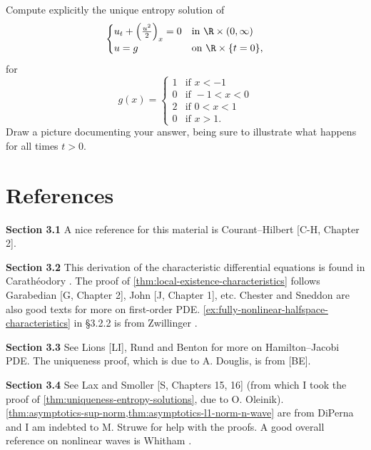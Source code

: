 \begin{exercise}
Compute explicitly the unique entropy solution of
$$
\begin{cases}
u_t + \left(\frac{u^2}{2}\right)_x = 0 & \text{in } \R \times (0, \infty) \\
u = g & \text{on } \R \times \{t = 0\},
\end{cases}
$$
for
$$g(x) = \begin{cases} 1 & \text{if } x < -1 \\ 0 & \text{if } -1 < x < 0 \\ 2 & \text{if } 0 < x < 1 \\ 0 & \text{if } x > 1. \end{cases}$$
Draw a picture documenting your answer, being sure to illustrate what happens for all times $t > 0$.
\end{exercise}

\section{References}
\label{sec:ch3-references}

\textbf{Section 3.1} \quad A nice reference for this material is Courant--Hilbert \cite{CourantHilbert1962} [C-H, Chapter 2].

\textbf{Section 3.2} \quad This derivation of the characteristic differential equations is found in Carath\'eodory \cite{Caratheodory1982}. The proof of \cref{thm:local-existence-characteristics} follows Garabedian \cite{Garabedian1964} [G, Chapter 2], John \cite{John1982} [J, Chapter 1], etc. Chester \cite{Chester1971} and Sneddon \cite{Sneddon1957} are also good texts for more on first-order PDE. \cref{ex:fully-nonlinear-halfspace-characteristics} in \S 3.2.2 is from Zwillinger \cite{Zwillinger1984}.

\textbf{Section 3.3} \quad See Lions \cite{PLLions1982} [LI], Rund \cite{Rund1973} and Benton \cite{Benton1977} for more on Hamilton--Jacobi PDE. The uniqueness proof, which is due to A. Douglis, is from \cite{Benton1977} [BE].

\textbf{Section 3.4} \quad See Lax \cite{Lax1973} and Smoller \cite{Smoller1983} [S, Chapters 15, 16] (from which I took the proof of \cref{thm:uniqueness-entropy-solutions}, due to O. Oleinik). \cref{thm:asymptotics-sup-norm,thm:asymptotics-l1-norm-n-wave} are from DiPerna \cite{DiPerna1983} and I am indebted to M. Struwe for help with the proofs. A good overall reference on nonlinear waves is Whitham \cite{Whitham1974}.
